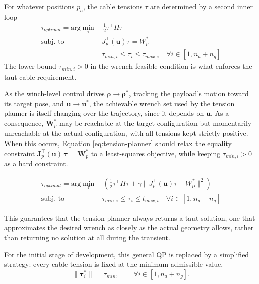 For whatever positions $p_a$, the cable tensions $\tau$ are determined by a second inner loop
\begin{equation}
    \begin{aligned}
    \tau_{optimal} = \text{arg} \min_\tau & \, \frac{1}{2}\tau^\top H \tau \\
    \text{subj. to} \quad 
        & J_p^\top(\mathbf{u}) \tau = W_p^* \\
        & \tau_{min, i} \le \tau_i \le \tau_{max, i} \quad \forall i \in [1, n_a+ n_g]
    \end{aligned}
    \label{eq:tension-planner}
\end{equation}
The lower bound $\tau_{min, i}>0$ in the wrench feasible condition is what enforces the taut-cable requirement.

As the winch-level control drives $\mathbf{\rho} \to \mathbf{\rho}^*$, tracking the payload's motion toward its target pose, and $\mathbf{u} \to \mathbf{u}^*$, the achievable wrench set used by the tension planner is itself changing over the trajectory, since it depends on $\mathbf{u}$. As a consequence, $\mathbf{W}_p^*$ may be reachable at the target configuration but momentarily unreachable at the actual configuration, with all tensions kept strictly positive. When this occurs, Equation \ref{eq:tension-planner} should relax the equality constraint $\mathbf{J}_p^\top(\mathbf{u})\,\mathbf{\tau} = \mathbf{W}_p^*$ to a least-squares objective, while keeping $\tau_{min,i} > 0$ as a hard constraint. 

\begin{equation}
        \begin{aligned}
    \tau_{optimal} = \text{arg} \min_\tau & \, \left(\frac{1}{2}\tau^\top H \tau +\gamma \| J_p^\top (\mathbf{u}) \tau - W_p^*\|^2\right) \\
    \text{subj. to} \quad 
        & \tau_{min, i} \le \tau_i \le t_{max, i} \quad \forall i \in [1, n_a+ n_g]
    \end{aligned}
    \label{eq:tension-planner-relax}
\end{equation}


This guarantees that the tension planner always returns a taut solution, one that approximates the desired wrench as closely as the actual geometry allows, rather than returning no solution at all during the transient.

For the initial stage of development, this general QP is replaced by a simplified strategy: every cable tension is fixed at the minimum admissible value,
\begin{equation}
    \lVert \mathbf{\tau}_i^* \rVert = \tau_{min}, \qquad \forall i \in [1, n_a + n_g].
    \label{eq:tau-min-simplification}
\end{equation}



